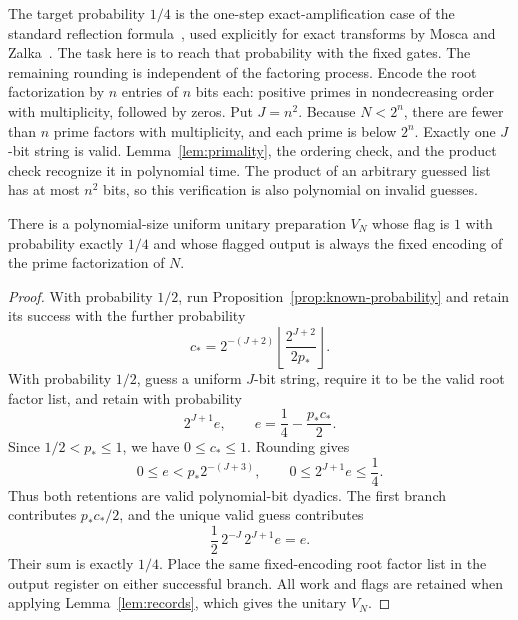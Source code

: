 The target probability $1/4$ is the one-step exact-amplification case
of the standard reflection formula~\cite[Section~2]{BHMT}, used explicitly
for exact transforms by Mosca and Zalka~\cite[Section~2.1]{MZ}. The task here
is to reach that probability with the fixed gates. The remaining rounding
is independent of the factoring process. Encode the root factorization by $n$ entries of $n$ bits each: positive primes in nondecreasing order with multiplicity, followed by zeros. Put $J=n^2$. Because $N<2^n$, there are fewer than $n$ prime factors with multiplicity, and each prime is below $2^n$. Exactly one $J$-bit string is valid. Lemma~\ref{lem:primality}, the ordering check, and the product check recognize it in polynomial time. The product of an arbitrary guessed list has at most $n^2$ bits, so this verification is also polynomial on invalid guesses.

\begin{lemma}\label{lem:quarter}
There is a polynomial-size uniform unitary preparation $V_N$ whose flag is $1$ with probability exactly $1/4$ and whose flagged output is always the fixed encoding of the prime factorization of $N$.
\end{lemma}
\begin{proof}
With probability $1/2$, run Proposition~\ref{prop:known-probability} and retain its success with the further probability
\[
 c_*=2^{-(J+2)}
       \left\lfloor\frac{2^{J+2}}{2p_*}\right\rfloor.
\]
With probability $1/2$, guess a uniform $J$-bit string, require it to be the valid root factor list, and retain with probability
\[
 2^{J+1}e,\qquad e=\frac14-\frac{p_*c_*}{2}.
\]
Since $1/2<p_*\le1$, we have $0\le c_*\le1$. Rounding gives
\[
 0\le e< p_*2^{-(J+3)},\qquad
 0\le2^{J+1}e\le\frac14.
\]
Thus both retentions are valid polynomial-bit dyadics. The first branch contributes $p_*c_*/2$, and the unique valid guess contributes
\[
 \frac12\,2^{-J}\,2^{J+1}e=e.
\]
Their sum is exactly $1/4$. Place the same fixed-encoding root factor list in the output register on either successful branch. All work and flags are retained when applying Lemma~\ref{lem:records}, which gives the unitary $V_N$.
\end{proof}

